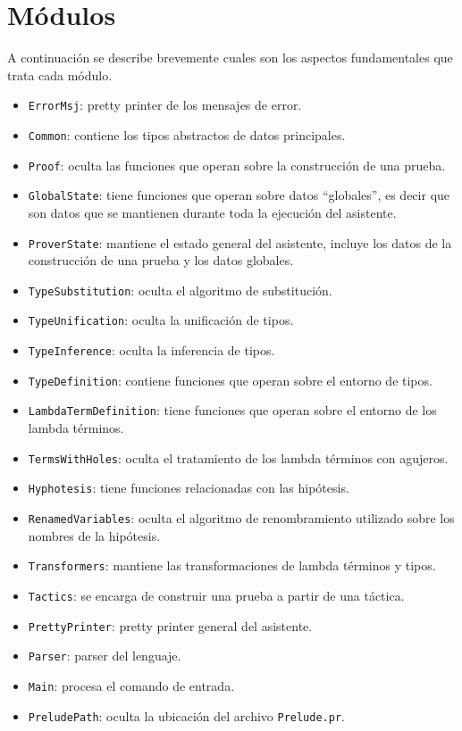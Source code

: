 \documentclass[a4paper,11pt]{article}
\theoremstyle{definition}
\theoremstyle{remark}
\begin{document}
\section{Módulos}

A continuación se describe brevemente cuales son los aspectos fundamentales que trata cada módulo.

\begin{itemize}

\item \texttt{ErrorMsj}: pretty printer de los mensajes de error.
\item \texttt{Common}: contiene los tipos abstractos de datos principales.
\item \texttt{Proof}: oculta las funciones que operan sobre la construcción de una prueba.
\item \texttt{GlobalState}: tiene funciones que operan sobre datos ``globales'', es decir que son
datos que se mantienen durante toda la ejecución del asistente.
\item \texttt{ProverState}: mantiene el estado general del asistente, incluye los datos de la
construcción de una prueba y los datos globales.
\item \texttt{TypeSubstitution}: oculta el algoritmo de substitución.
\item \texttt{TypeUnification}: oculta la unificación de tipos.
\item \texttt{TypeInference}: oculta la inferencia de tipos.
\item \texttt{TypeDefinition}: contiene funciones que operan sobre el entorno de tipos.
\item \texttt{LambdaTermDefinition}: tiene funciones que operan sobre el entorno de los lambda términos.
\item \texttt{TermsWithHoles}: oculta el tratamiento de los lambda términos con agujeros.
\item \texttt{Hyphotesis}: tiene funciones relacionadas con las hipótesis.
\item \texttt{RenamedVariables}: oculta el algoritmo de renombramiento utilizado sobre los nombres de la hipótesis.
\item \texttt{Transformers}: mantiene las transformaciones de lambda términos y tipos.
\item \texttt{Tactics}: se encarga de construir una prueba a partir de una táctica.
\item \texttt{PrettyPrinter}: pretty printer general del asistente.
\item \texttt{Parser}: parser del lenguaje.
\item \texttt{Main}: procesa el comando de entrada. 
\item \texttt{PreludePath}: oculta la ubicación del archivo \texttt{Prelude.pr}.

\end{itemize}
\end{document}
